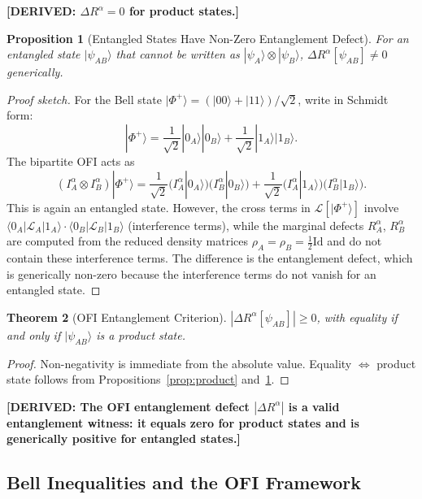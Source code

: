 \documentclass[12pt]{article}
\newtheorem{theorem}{Theorem}[section]
\newtheorem{proposition}[theorem]{Proposition}
\theoremstyle{definition}
\newcommand{\Id}{\mathrm{Id}}
\newcommand{\DERIVED}[1]{\textcolor{derivedcolor}{\textbf{[DERIVED: #1]}}}
\begin{document}
\DERIVED{$\Delta R^\alpha = 0$ for product states.}

\begin{proposition}[Entangled States Have Non-Zero Entanglement Defect]
\label{prop:entangled}
For an entangled state $|\psi_{AB}\rangle$ that cannot be written as
$|\psi_A\rangle\otimes|\psi_B\rangle$, $\Delta R^\alpha[\psi_{AB}] \neq 0$
generically.
\end{proposition}

\begin{proof}[Proof sketch]
For the Bell state $|\Phi^+\rangle = (|00\rangle+|11\rangle)/\sqrt{2}$,
write in Schmidt form:
\[
  |\Phi^+\rangle = \frac{1}{\sqrt{2}}|0_A\rangle|0_B\rangle
                 + \frac{1}{\sqrt{2}}|1_A\rangle|1_B\rangle.
\]
The bipartite OFI acts as
\[
  (I^\alpha_A\otimes I^\alpha_B)|\Phi^+\rangle
  = \frac{1}{\sqrt{2}}\bigl(I^\alpha_A|0_A\rangle\bigr)
    \bigl(I^\alpha_B|0_B\rangle\bigr)
  + \frac{1}{\sqrt{2}}\bigl(I^\alpha_A|1_A\rangle\bigr)
    \bigl(I^\alpha_B|1_B\rangle\bigr).
\]
This is again an entangled state.  However, the cross terms in
$\mathcal{L}[|\Phi^+\rangle]$ involve $\langle 0_A|\mathcal{L}_A|1_A\rangle
\cdot\langle 0_B|\mathcal{L}_B|1_B\rangle$ (interference terms), while
the marginal defects $R^\alpha_A$, $R^\alpha_B$ are computed from
the reduced density matrices $\rho_A = \rho_B = \frac{1}{2}\Id$ and
do not contain these interference terms.  The difference is the
entanglement defect, which is generically non-zero because the
interference terms do not vanish for an entangled state.
\end{proof}

\begin{theorem}[OFI Entanglement Criterion]
\label{thm:ent-criterion}
$|\Delta R^\alpha[\psi_{AB}]| \geq 0$, with equality if and only if
$|\psi_{AB}\rangle$ is a product state.
\end{theorem}

\begin{proof}
Non-negativity is immediate from the absolute value.  Equality $\Leftrightarrow$
product state follows from Propositions~\ref{prop:product}
and~\ref{prop:entangled}.
\end{proof}

\DERIVED{The OFI entanglement defect $|\Delta R^\alpha|$ is a valid
entanglement witness: it equals zero for product states and is
generically positive for entangled states.}

\subsection{Bell Inequalities and the OFI Framework}
\end{document}
